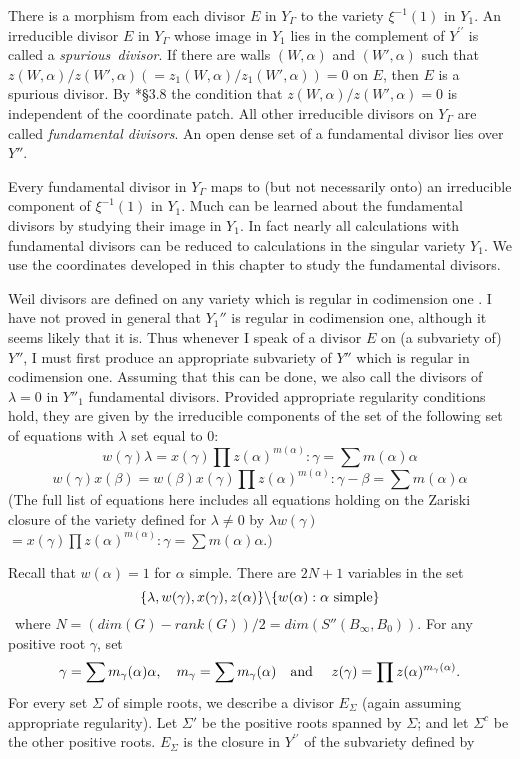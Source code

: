 \documentclass{memo-l}
\theoremstyle{definition}
\theoremstyle{remark}
\numberwithin{section}{chapter}
\numberwithin{equation}{chapter}
\begin{document}
   There is a morphism from each divisor $E$ in $Y_{{\Gamma}}$ to the variety
${\xi}^{-1}(1)$ in $Y_{1}$.
 An irreducible divisor $E$ in $Y_{{\Gamma}}$ whose image in $Y_{1}$ lies in the
complement of $Y^{\prime\prime}$ is called a {\it spurious\ divisor}.  If there are walls
$(W,{\alpha})$ and $(W',{\alpha})$ such that $z(W,{\alpha})/z(W',{\alpha})
(= z_{1}(W,{\alpha})/z_{1}(W',{\alpha})) = 0$ on $E$, then $E$ is a spurious divisor.
 By \cite{MR701566}*{\S3.8} the condition that $z(W,{\alpha})/z(W',{\alpha}) = 0$ is
independent of the coordinate patch.
 All other irreducible divisors on $Y_{{\Gamma}}$ are called {\it  fundamental divisors}.
An open dense set of a fundamental divisor lies over $Y''$.

   Every fundamental divisor in $Y_{{\Gamma}}$ maps to (but not necessarily onto)
an irreducible component of ${\xi}^{-1}(1)$ in $Y_{1}$.
 Much can be learned about the fundamental divisors by studying their image in $Y_{1}$.
 In fact nearly all calculations with fundamental divisors can be reduced to
calculations in the singular variety $Y_{1}$.
 We use the coordinates developed in this chapter to study the fundamental divisors.


   Weil divisors are defined on any variety which is regular in codimension
one \cite{MR0463157}.
 I have not proved in general that $Y_{1}''$ is regular in codimension one,
although it seems likely that it is.
 Thus whenever I speak of a divisor $E$ on (a subvariety of) $Y''$, I must first
produce an appropriate subvariety of $Y''$ which is regular in codimension one.
 Assuming that this can be done, we also call the divisors of ${\lambda} = 0$
in $Y''_{1}$ fundamental divisors.
 Provided appropriate regularity conditions hold, they are given by the
irreducible components of the set of the following set of equations with
${\lambda}$ set equal to $0$:
$$
w({\gamma}){\lambda} = x({\gamma}) \prod
z({\alpha})^{m({\alpha})} : {\gamma} = \sum m({\alpha}){\alpha}
$$
$$
w({\gamma})x({\beta}) = w({\beta})x({\gamma}) \prod
z({\alpha})^{m({\alpha})}  : {\gamma}-{\beta} = \sum m({\alpha}){\alpha}
$$
(The full list of equations here includes all equations holding on the Zariski
closure of the variety defined for ${\lambda}\ne 0$ by ${\lambda}w({\gamma})$
$= x({\gamma})\prod z({\alpha})^{m({\alpha})} : {\gamma} =
\sum m({\alpha}){\alpha}.)$

   Recall that $w({\alpha})=1$ for ${\alpha}$ simple.
 There are $2N+1$ variables in the set
 $$
 \{{\lambda},w({\gamma}),x({\gamma}),
z(\alpha)\}\backslash \{w(\alpha) : {\alpha} \hbox{ simple}\}
$$
\ where  $N =
(dim(G)-rank(G))/2 = dim(S''(B_{{\infty}},B_{0}))$.
 For any positive root ${\gamma}$, set
 $${\gamma}=\sum m_{{\gamma}}
({\alpha}){\alpha}, \quad m_{{\gamma}}=\sum m_{{\gamma}}({\alpha})
\quad\hbox{and }\quad
z({\gamma}) = \prod z({\alpha})^{m_\gamma(\alpha)}.$$
For every set
${\Sigma}$ of simple roots, we describe a divisor $E_{{\Sigma}}$ (again
assuming appropriate regularity).
 Let ${\Sigma}'$ be the positive roots spanned by ${\Sigma}$; and let
${\Sigma}^{c}$ be the other positive roots.
 $E_{{\Sigma}}$ is the closure in $Y^{\prime\prime}$ of the subvariety defined by
\end{document}
